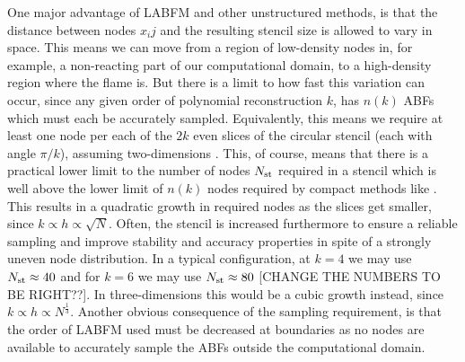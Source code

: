 One major advantage of LABFM and other unstructured methods, is that the distance between nodes $x_ij$ and the resulting stencil size is allowed to vary in space. This means we can move from a region of low-density nodes in, for example, a non-reacting part of our computational domain, to a high-density region where the flame is. But there is a limit to how fast this variation can occur, since any given order of polynomial reconstruction $k$, has $n(k)$ ABFs which must each be accurately sampled. Equivalently, this means we require at least one node per each of the $2k$ even slices of the circular stencil (each with angle $\pi / k$), assuming two-dimensions \cite{king2020HighOrderDifference}. This, of course, means that there is a practical lower limit to the number of nodes $N_{\rm{st}}$ required in a stencil which is well above the lower limit of $n(k)$ nodes required by compact methods like \cite{jensen1972FiniteDifferenceTechniques}. This results in a quadratic growth in required nodes as the slices get smaller, since $k \propto h \propto \sqrt{N}$. Often, the stencil is increased furthermore to ensure a reliable sampling and improve stability and accuracy properties in spite of a strongly uneven node distribution. In a typical configuration, at $k = 4$ we may use $N_{\rm{st}} \approx 40$ and for $k = 6$ we may use $N_{\rm{st}} \approx 80$ [CHANGE THE NUMBERS TO BE RIGHT??]. In three-dimensions this would be a cubic growth instead, since $k \propto h \propto N^{\frac{1}{3}}$. Another obvious consequence of the sampling requirement, is that the order of LABFM used must be decreased at boundaries as no nodes are available to accurately sample the ABFs outside the computational domain.






